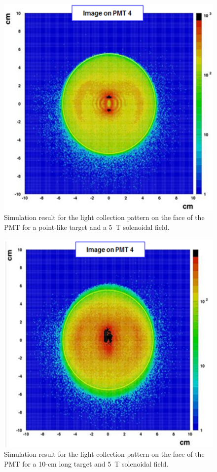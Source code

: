 \begin{figure}[!ht]
    \centering
    \includegraphics[width=1.0\linewidth,trim={0.0cm 0.0cm 0.0cm 0.0cm},clip]{images/Point_Targ_5T_Field_PMT.png}
    \caption{Simulation result for the light collection pattern on the face of the PMT for a point-like target and a 5~T
      solenoidal field.}
    \label{fig:Point_Targ_5T_Field_PMT}
\end{figure}

\begin{figure}[!ht]
    \centering
    \includegraphics[width=1.0\linewidth,trim={0.0cm 0.0cm 0.0cm 0.0cm},clip]{images/10cm_Targ_5T_Field_PMT.png}
    \caption{Simulation result for the light collection pattern on the face of the PMT for a 10-cm long target and 5~T
      solenoidal field.}
    \label{fig:10cm_Targ_5T_Field_PMT}
\end{figure}

